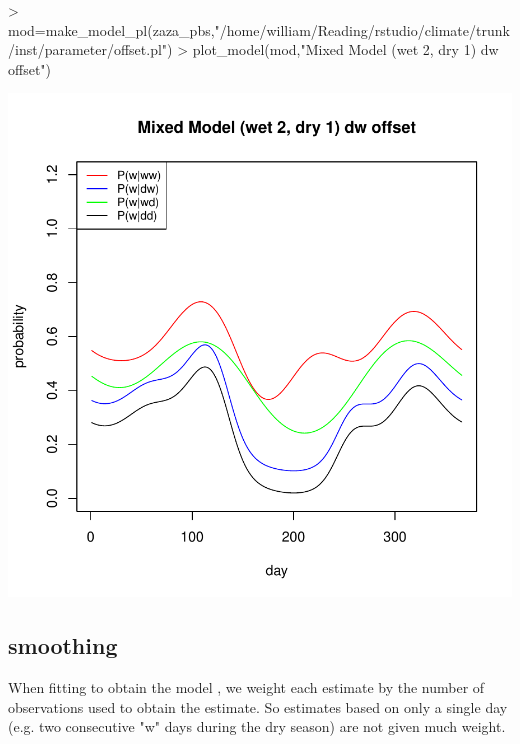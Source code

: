 \documentclass{article}
\begin{document}
\begin{Schunk}
\begin{Sinput}
> mod=make_model_pl(zaza_pbs,"/home/william/Reading/rstudio/climate/trunk/inst/parameter/offset.pl")
> plot_model(mod,"Mixed Model (wet 2, dry 1) dw offset")
\end{Sinput}
\end{Schunk}
\includegraphics{climate_vignette-013}


\subsection{smoothing}


When fitting to obtain the model , we weight each estimate by the number of observations used to
obtain the estimate.  So estimates based on only a single day (e.g. two
consecutive "w" days during the dry season) are not given much weight.   
\end{document}
